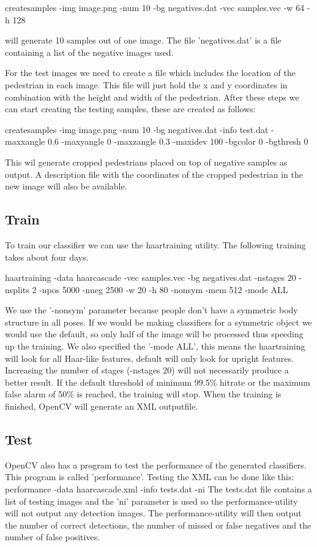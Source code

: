 \documentclass{article}
\begin{document}
createsamples -img image.png -num 10 -bg negatives.dat -vec samples.vec -w 64 -h 128

will generate 10 samples out of one image.
The file 'negatives.dat' is a file containing a list of the negative images used.

For the test images we need to create a file which includes the location of the pedestrian in each image. This file will just hold the x and y coordinates in combination with the height and width of the pedestrian.
After these steps we can start creating the testing samples, these are created as follows:

createsamples -img image.png -num 10 -bg negatives.dat -info test.dat -maxxangle 0.6 -maxyangle 0 -maxzangle 0.3 -maxidev 100 -bgcolor 0 -bgthresh 0

This wil generate cropped pedestrians placed on top of negative samples as output. A description file with the coordinates of the cropped pedestrian in the new image will also be available.




\subsection{Train}

To train our classifier we can use the haartraining utility. The following training takes about four days.

haartraining -data haarcascade -vec samples.vec -bg negatives.dat -nstages 20 -nsplits 2 -npos 5000 -nneg 2500 -w 20 -h 80 -nonsym -mem 512 -mode ALL

We use the '-nonsym' parameter because people don't have a symmetric body structure in all poses. If we would be making classifiers for a symmetric object we would use the default, so only half of the image will be processed  thus speeding up the training. We also specified the '-mode ALL', this means the haartraining will look for all Haar-like features, default will only look for upright features.
Increasing the number of stages (-nstages 20) will not necessarily produce a better result. If the default threshold of minimum 99.5\% hitrate or the maximum false alarm of 50\% is reached, the training will stop.
When the training is finished, OpenCV will generate an XML outputfile.

\subsection{Test}
OpenCV also has a program to test the performance of the generated classifiers. This program is called 'performance'. Testing the XML can be done like this:
performance -data haarcascade.xml -info tests.dat -ni
The tests.dat file contains a list of testing images and the 'ni' parameter is used so the performance-utility will not output any detection images.
The performance-utility will then output the number of correct detections, the number of missed or false negatives and the number of false positives.
\end{document}
